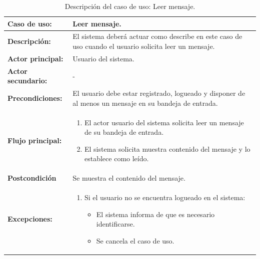 \begin{table}[H]
  \begin{center}
    \begin{tabular}{|p{3.5cm}|p{10cm}|}
      \hline
      {\textbf{Caso de uso:}} & { Leer mensaje.} \\
      \hline
      {\textbf{Descripción:}} & { El sistema deberá actuar como describe en este caso de uso cuando el usuario solicita leer un mensaje.} \\
     \hline
      {\textbf{Actor principal:}} & { Usuario del sistema.} \\
      \hline
      {\textbf{Actor secundario:}} & { - } \\
      \hline
      {\textbf{Precondiciones:}} & { El usuario debe estar registrado, logueado y disponer de al menos un mensaje en su bandeja de entrada. } \\
     \hline   
    {\textbf{Flujo principal:}} & { 
      \begin{enumerate}
	\item El actor usuario del sistema solicita leer un mensaje de su bandeja de entrada.
	\item El sistema solicita muestra contenido del mensaje y lo establece como leído.
      \end{enumerate}
      } \\
     \hline
     {\textbf{Postcondición}} & { Se muestra el contenido del mensaje.}\\
     \hline
     
      {\textbf{Excepciones:}} & {
	\begin{enumerate}
	  \item Si el usuario no se encuentra logueado en el sistema:
	  \begin{itemize}
	    \item El sistema informa de que es necesario identificarse.
	    \item Se cancela el caso de uso.
	  \end{itemize}
	\end{enumerate}
	}\\
      \hline
    \end{tabular}
  \end{center}
\caption{Descripción del caso de uso: Leer mensaje.}
\end{table}


